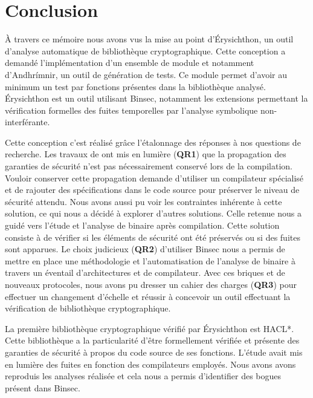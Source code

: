 \chapter*{Conclusion}

À travers ce mémoire nous avons vus la mise au point d'Érysichthon, un outil d'analyse automatique de bibliothèque cryptographique. Cette conception a demandé l'implémentation d'un ensemble de module et notamment d'Andhrímnir, un outil de génération de tests. Ce module permet d'avoir au minimum un test par fonctions présentes dans la bibliothèque analysé. Érysichthon est un outil utilisant Binsec, notamment les extensions permettant la vérification formelles des fuites temporelles par l'analyse symbolique non-interférante.\smallbreak

Cette conception c'est réalisé grâce l'étalonnage des réponses à nos questions de recherche. Les travaux de \citeauthor{schneider2024breakingbadcompilersbreak} ont mis en lumière (\textbf{QR1}) que la propagation des garanties de sécurité n'est pas nécessairement conservé lors de la compilation. Vouloir conserver cette propagation demande d'utiliser un compilateur spécialisé et de rajouter des spécifications dans le code source pour préserver le niveau de sécurité attendu. Nous avons aussi pu voir les contraintes inhérente à cette solution, ce qui nous a décidé à explorer d'autres solutions. Celle retenue nous a guidé vers l'étude et l'analyse de binaire après compilation. Cette solution consiste à de vérifier si les éléments de sécurité ont été préservés ou si des fuites sont apparues. Le choix judicieux (\textbf{QR2}) d'utiliser Binsec nous a permis de mettre en place une méthodologie et l'automatisation de l'analyse de binaire à travers un éventail d'architectures et de compilateur. Avec ces briques et de nouveaux protocoles, nous avons pu dresser un cahier des charges (\textbf{QR3}) pour effectuer un changement d'échelle et réussir à concevoir un outil effectuant la vérification de bibliothèque cryptographique.\smallbreak

La première bibliothèque cryptographique vérifié par Érysichthon est HACL*. Cette bibliothèque a la particularité d'être formellement vérifiée et présente des garanties de sécurité à propos du code source de ses fonctions. L'étude \cite{schneider2024breakingbadcompilersbreak} avait mis en lumière des fuites en fonction des compilateurs employés. Nous avons avons reproduis les analyses réalisée et cela nous a permis d'identifier des bogues présent dans Binsec.\smallbreak

